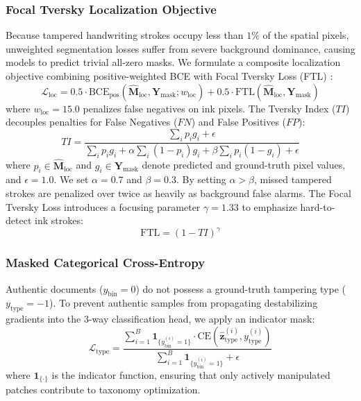 \documentclass[pdflatex,sn-mathphys-num,iicol]{sn-jnl}
\begin{document}
\subsubsection{Focal Tversky Localization Objective}
Because tampered handwriting strokes occupy less than $1\%$ of the spatial pixels, unweighted segmentation losses suffer from severe background dominance, causing models to predict trivial all-zero masks. We formulate a composite localization objective combining positive-weighted BCE with Focal Tversky Loss (FTL) \cite{bib16,bib17}:
\begin{equation}
\mathcal{L}_{\text{loc}} = 0.5 \cdot \text{BCE}_{\text{pos}}(\hat{\mathbf{M}}_{\text{loc}}, \mathbf{Y}_{\text{mask}}; w_{\text{loc}}) + 0.5 \cdot \text{FTL}(\hat{\mathbf{M}}_{\text{loc}}, \mathbf{Y}_{\text{mask}})\label{eq_loss_loc}
\end{equation}
where $w_{\text{loc}} = 15.0$ penalizes false negatives on ink pixels. The Tversky Index ($TI$) decouples penalties for False Negatives ($FN$) and False Positives ($FP$):
\begin{equation}
TI = \frac{\sum_i p_i g_i + \epsilon}{\sum_i p_i g_i + \alpha \sum_i (1 - p_i) g_i + \beta \sum_i p_i (1 - g_i) + \epsilon}\label{eq_tversky}
\end{equation}
where $p_i \in \hat{\mathbf{M}}_{\text{loc}}$ and $g_i \in \mathbf{Y}_{\text{mask}}$ denote predicted and ground-truth pixel values, and $\epsilon = 1.0$. We set $\alpha = 0.7$ and $\beta = 0.3$. By setting $\alpha > \beta$, missed tampered strokes are penalized over twice as heavily as background false alarms. The Focal Tversky Loss introduces a focusing parameter $\gamma = 1.33$ to emphasize hard-to-detect ink strokes:
\begin{equation}
\text{FTL} = (1 - TI)^\gamma\label{eq_ftl}
\end{equation}

\subsubsection{Masked Categorical Cross-Entropy}
Authentic documents ($y_{\text{bin}} = 0$) do not possess a ground-truth tampering type ($y_{\text{type}} = -1$). To prevent authentic samples from propagating destabilizing gradients into the 3-way classification head, we apply an indicator mask:
\begin{equation}
\mathcal{L}_{\text{type}} = \frac{\sum_{i=1}^B \mathbf{1}_{\{y_{\text{bin}}^{(i)} = 1\}} \cdot \text{CE}(\hat{\mathbf{z}}_{\text{type}}^{(i)}, y_{\text{type}}^{(i)})}{\sum_{i=1}^B \mathbf{1}_{\{y_{\text{bin}}^{(i)} = 1\}} + \epsilon}\label{eq_loss_type}
\end{equation}
where $\mathbf{1}_{\{\cdot\}}$ is the indicator function, ensuring that only actively manipulated patches contribute to taxonomy optimization.
\end{document}
